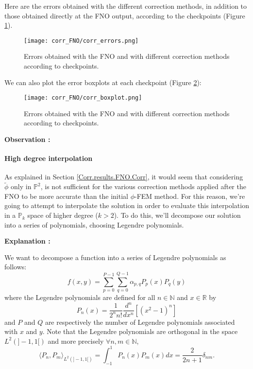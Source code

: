 Here are the errors obtained with the different correction methods, in addition to those obtained directly at the FNO output, according to the checkpoints (Figure \ref{corr_errors}).

\begin{figure}[H]
	\centering
	\texttt{[image: corr\_FNO/corr\_errors.png]}
	\caption{Errors obtained with the FNO and with different correction methods according to checkpoints.}
	\label{corr_errors}
\end{figure} 

We can also plot the error boxplots at each checkpoint (Figure \ref{corr_boxplot}):

\begin{figure}[H]
	\centering
	\texttt{[image: corr\_FNO/corr\_boxplot.png]}
	\caption{Errors obtained with the FNO and with different correction methods according to checkpoints.}
	\label{corr_boxplot}
\end{figure} 

\textbf{Observation :} 

\paragraph{High degree interpolation} \label{Corr.results.FNO.Legendre}

As explained in Section \ref{Corr.results.FNO.Corr}, it would seem that considering $\tilde{\phi}$ only in $\mathbb{P}^2$, is not sufficient for the various correction methods applied after the FNO to be more accurate than the initial $\phi$-FEM method. For this reason, we're going to attempt to interpolate the solution in order to evaluate this interpolation in a $\mathbb{P}_k$ space of higher degree ($k>2$). To do this, we'll decompose our solution into a series of polynomials, choosing Legendre polynomials.

\textbf{Explanation :}

We want to decompose a function into a series of Legendre polynomials as follows:
\begin{equation*}
	f(x,y)=\sum_{p=0}^{P-1}\sum_{q=0}^{Q-1}\alpha_{p,q}P_p(x)P_q(y)
	\label{decomp}
\end{equation*}
where the Legendre polynomials are defined for all $n\in\mathbb{N}$ and $x\in\mathbb{R}$ by
\begin{equation*}
	P_n(x)=\frac{1}{2^n n!}\frac{d^n}{dx^n}[(x^2-1)^n]
\end{equation*}
and $P$ and $Q$ are respectively the number of Legendre polynomials associated with $x$ and $y$.
Note that the Legendre polynomials are orthogonal in the space $L^2(]-1,1[)$ and more precisely $\forall n,m\in\mathbb{N}$,
\begin{equation*}
	\langle P_n,P_m\rangle_{L^2(]-1,1[)}=\int_{-1}^1 P_n(x)P_m(x)dx=\frac{2}{2n+1}\delta_{nm}.
	\label{ortho}
\end{equation*}

